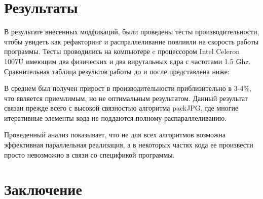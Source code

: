 \documentclass{matmex-diploma-custom}
\begin{document}
\section{Результаты}
В результате внесенных модфикаций, были проведены тесты производительности, чтобы увидеть как рефакторинг и распраллеливание повлияли на скорость работы программы. Тесты  проводились на компьютере c процессором Intel Celeron 1007U имеющим два физических и два вирутальных ядра с частотами 1.5 Ghz. Сравнительная таблица результов работы до и после представлена ниже:

В среднем был получен прирост в производительности приблизительно в 3-4\%, что является приемлимым, но не оптимальным результатом. Данный результат связан прежде всего с высокой связностью алгоритма packJPG, где многие итеративные элементы кода не поддаются полному распараллеливанию.

Проведенный анализ показывает, что не для всех алгоритмов возможна эффективная параллельная реализация, а в некоторых частях кода ее произвести просто невозможно в связи со спецификой программы.

\section*{Заключение}




\end{document}
